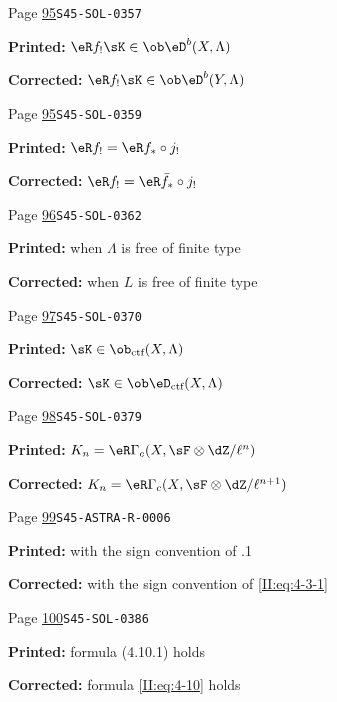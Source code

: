 \begin{description}
\smallskip
\item[\hypertarget{apparatus:EN-0036}{36}] Page \hyperlink{printpage:en:95}{95}\quad\texttt{S45-SOL-0357}
\par\noindent\textbf{Printed:} $\eR f_!\sK\in \ob \eD^b(X,\Lambda)$
\par\noindent\textbf{Corrected:} $\eR f_!\sK\in \ob \eD^b(Y,\Lambda)$
\smallskip
\item[\hypertarget{apparatus:EN-0037}{37}] Page \hyperlink{printpage:en:95}{95}\quad\texttt{S45-SOL-0359}
\par\noindent\textbf{Printed:} $\eR f_! = \eR f_*\circ j_!$
\par\noindent\textbf{Corrected:} $\eR f_! = \eR \bar f_*\circ j_!$
\smallskip
\item[\hypertarget{apparatus:EN-0038}{38}] Page \hyperlink{printpage:en:96}{96}\quad\texttt{S45-SOL-0362}
\par\noindent\textbf{Printed:} when $\Lambda$ is free of finite type
\par\noindent\textbf{Corrected:} when $L$ is free of finite type
\smallskip
\item[\hypertarget{apparatus:EN-0039}{39}] Page \hyperlink{printpage:en:97}{97}\quad\texttt{S45-SOL-0370}
\par\noindent\textbf{Printed:} \(\sK\in\ob_{\text{ctf}}(X,\Lambda)\)
\par\noindent\textbf{Corrected:} \(\sK\in\ob\eD_\text{ctf}(X,\Lambda)\)
\smallskip
\item[\hypertarget{apparatus:EN-0040}{40}] Page \hyperlink{printpage:en:98}{98}\quad\texttt{S45-SOL-0379}
\par\noindent\textbf{Printed:} $K_n=\eR\Gamma_c(X,\sF\otimes\dZ/\ell^n)$
\par\noindent\textbf{Corrected:} $K_n=\eR\Gamma_c(X,\sF\otimes\dZ/\ell^{n+1})$
\smallskip
\item[\hypertarget{apparatus:EN-0041}{41}] Page \hyperlink{printpage:en:99}{99}\quad\texttt{S45-ASTRA-R-0006}
\par\noindent\textbf{Printed:} with the sign convention of .1
\par\noindent\textbf{Corrected:} with the sign convention of \ref{II:eq:4-3-1}
\smallskip
\item[\hypertarget{apparatus:EN-0042}{42}] Page \hyperlink{printpage:en:100}{100}\quad\texttt{S45-SOL-0386}
\par\noindent\textbf{Printed:} formula (4.10.1) holds
\par\noindent\textbf{Corrected:} formula \eqref{II:eq:4-10} holds

\end{description}
